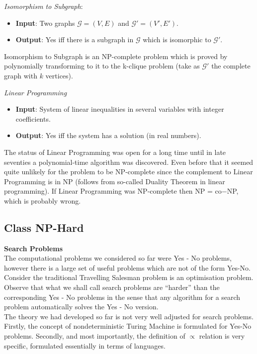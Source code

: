 \textit{Isomorphism to Subgraph}:
\begin{itemize}
    \item \textbf{Input}:
        Two graphs $\mathcal{G} = (V, E)$
        and $\mathcal{G}\prime = (V\prime, E\prime)$.
    \item \textbf{Output}:
        Yes iff there is a subgraph in $\mathcal{G}$ which is isomorphic to $\mathcal{G}\prime$.
\end{itemize}

Isomorphism to Subgraph is an NP-complete problem
which is proved by polynomially transforming to it to the k-clique problem
(take as $\mathcal{G}\prime$ the complete graph with $k$ vertices).

\textit{Linear Programming}
\begin{itemize}
    \item \textbf{Input}: System of linear inequalities in several variables with integer coefficients.
    \item \textbf{Output}: Yes iff the system has a solution (in real numbers).
\end{itemize}

The status of Linear Programming was open for a long time
until in late seventies a polynomial-time algorithm was discovered.
Even before that it seemed quite unlikely for the problem to be NP-complete
since the complement to Linear Programming is in NP
(follows from so-called Duality Theorem in linear programming).
If Linear Programming was NP-complete then NP = co−NP, which is probably wrong.

\subsection{Class NP-Hard}
\textbf{Search Problems}\\
The computational problems we considered so far were Yes - No problems,
however there is a large set of useful problems which are not of the form Yes-No.
Consider the traditional Travelling Salesman problem is an optimisation problem.
Observe that what we shall call search problems are “harder” than the corresponding Yes - No problems
in the sense that any algorithm for a search problem automatically solves the Yes - No version.\\

The theory we had developed so far is not very well adjusted for search problems.
Firstly, the concept of nondeterministic Turing Machine is formulated for Yes-No problems.
Secondly, and most importantly, the definition of $\propto$ relation is very specific,
formulated essentially in terms of languages.\\

